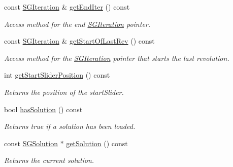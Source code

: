 \begin{DoxyCompactItemize}
\mbox{\label{classSGPlotController_ab58cbd98d25e98ecd905b9c2ba2c2c6b}} 
const \hyperlink{classSGIteration}{S\+G\+Iteration} \& \hyperlink{classSGPlotController_ab58cbd98d25e98ecd905b9c2ba2c2c6b}{get\+End\+Iter} () const
\begin{DoxyCompactList}\small\item\em Access method for the end \hyperlink{classSGIteration}{S\+G\+Iteration} pointer. \end{DoxyCompactList}\item 
\mbox{\label{classSGPlotController_ae00c2c6453213013a890f0723ef3e168}} 
const \hyperlink{classSGIteration}{S\+G\+Iteration} \& \hyperlink{classSGPlotController_ae00c2c6453213013a890f0723ef3e168}{get\+Start\+Of\+Last\+Rev} () const
\begin{DoxyCompactList}\small\item\em Access method for the \hyperlink{classSGIteration}{S\+G\+Iteration} pointer that starts the last revolution. \end{DoxyCompactList}\item 
\mbox{\label{classSGPlotController_aaf368cb6f7e3893fa165c40ef3b17f50}} 
int \hyperlink{classSGPlotController_aaf368cb6f7e3893fa165c40ef3b17f50}{get\+Start\+Slider\+Position} () const
\begin{DoxyCompactList}\small\item\em Returns the position of the start\+Slider. \end{DoxyCompactList}\item 
\mbox{\label{classSGPlotController_a21e04610454ab6936d782931d5fd35c5}} 
bool \hyperlink{classSGPlotController_a21e04610454ab6936d782931d5fd35c5}{has\+Solution} () const
\begin{DoxyCompactList}\small\item\em Returns true if a solution has been loaded. \end{DoxyCompactList}\item 
\mbox{\label{classSGPlotController_ab6da5d8489ad707cf6d6c460517f303f}} 
const \hyperlink{classSGSolution}{S\+G\+Solution} $\ast$ \hyperlink{classSGPlotController_ab6da5d8489ad707cf6d6c460517f303f}{get\+Solution} () const
\begin{DoxyCompactList}\small\item\em Returns the current solution. \end{DoxyCompactList}\item 

\end{DoxyCompactItemize}
